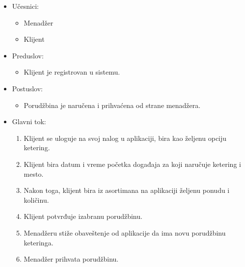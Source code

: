 \documentclass[a4paper]{article}
\begin{document}
  \begin{itemize}
        \item Učesnici:
         \begin{itemize}
        \item Menadžer
    \end{itemize}
          \begin{itemize}
        \item Klijent
    \end{itemize}
    
    \end{itemize}
      \begin{itemize}
        \item Preduslov:
          \begin{itemize}
        \item Klijent je registrovan u sistemu.
       
   \end{itemize}
    
    \end{itemize}
      \begin{itemize}
        \item Postuslov:
          \begin{itemize}
        \item Porudžbina je naručena i prihvaćena od strane menadžera.
    \end{itemize}
    \end{itemize}
      \begin{itemize}
        \item Glavni tok:
          \begin{enumerate}
          
              \item Klijent se uloguje na svoj nalog u aplikaciji, bira kao željenu opciju ketering.
              
              \item Klijent bira datum i vreme početka događaja za koji naručuje ketering i mesto.
          
              \item Nakon toga, klijent bira iz asortimana na aplikaciji željenu ponudu i količinu.
              
              \item Klijent potvrđuje izabranu porudžbinu.
        
              \item Menadžeru stiže obaveštenje od aplikacije da ima novu porudžbinu keteringa.
         
              \item Menadžer prihvata porudžbinu.
      
          \end{enumerate}
    \end{itemize}
    
\end{document}
